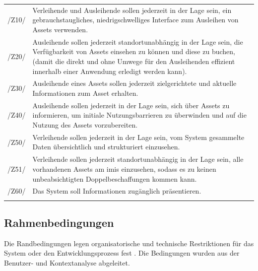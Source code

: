 \begin{center}
        \renewcommand{\arraystretch}{1.5}
        \begin{longtable}{lp{}}
                \arrayrulecolor{maincolor}\hline
                \sffamily\color{maincolor}/Z10/ & Verleihende und Ausleihende sollen jederzeit in
                der Lage sein, ein gebrauchstaugliches, niedrigschwelliges Interface zum Ausleihen
                von Assets verwenden. \\
                \sffamily\color{maincolor}/Z20/ & Ausleihende sollen jederzeit standortunabhängig in der Lage sein, die
                Verfügbarkeit von Assets einsehen zu können und diese zu buchen, (damit die
                direkt und ohne Umwege für den Ausleihenden effizient innerhalb einer
                Anwendung erledigt werden kann). \\
                \sffamily\color{maincolor}/Z30/ & Ausleihende eines Assets sollen jederzeit zielgerichtete und aktuelle
                Informationen zum Asset erhalten. \\
                \sffamily\color{maincolor}/Z40/ & Ausleihende sollen jederzeit in der Lage sein, sich über Assets zu
                informieren, um initiale Nutzungsbarrieren zu überwinden und auf die Nutzung des
                Assets vorzubereiten.\\
                \sffamily\color{maincolor}/Z50/ & Verleihende sollen jederzeit in der Lage sein, vom
                System gesammelte Daten übersichtlich und strukturiert einzusehen.\\
                \sffamily\color{maincolor}/Z51/ & Verleihende sollen jederzeit standortunabhängig in
                der Lage sein, alle vorhandenen Assets am \ac{imis} einzusehen, sodass es zu keinen
                unbeabsichtigten Doppelbeschaffungen kommen kann. \\
                \sffamily\color{maincolor}/Z60/ & Das System soll Informationen zugänglich präsentieren.\\
                \arrayrulecolor{maincolor}\hline
        \end{longtable}
\end{center}
\vspace*{-1.5cm}
\subsection{Rahmenbedingungen}
\label{section:rahmen}
Die Randbedingungen legen organisatorische und technische Restriktionen für das System oder den
Entwicklungsprozess fest \cite{balzert2009}. Die Bedingungen wurden aus der Benutzer- und
Kontextanalyse abgeleitet.

